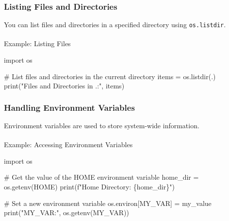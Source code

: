 \documentclass[
  letterpaper,
  DIV=11,
  numbers=noendperiod]{scrreprt}
\makeatletter
\let\oldparagraph\paragraph
\renewcommand{\paragraph}{
    \@ifstar
      \xxxParagraphStar
      \xxxParagraphNoStar
  }
\newcommand{\xxxParagraphStar}[1]{\oldparagraph*{#1}\mbox{}}
\newcommand{\xxxParagraphNoStar}[1]{\oldparagraph{#1}\mbox{}}
\newenvironment{Shaded}{\begin{snugshade}}{\end{snugshade}}
\newcommand{\BuiltInTok}[1]{\textcolor[rgb]{0.00,0.23,0.31}{#1}}
\newcommand{\CommentTok}[1]{\textcolor[rgb]{0.37,0.37,0.37}{#1}}
\newcommand{\ImportTok}[1]{\textcolor[rgb]{0.00,0.46,0.62}{#1}}
\newcommand{\NormalTok}[1]{\textcolor[rgb]{0.00,0.23,0.31}{#1}}
\newcommand{\OperatorTok}[1]{\textcolor[rgb]{0.37,0.37,0.37}{#1}}
\newcommand{\SpecialCharTok}[1]{\textcolor[rgb]{0.37,0.37,0.37}{#1}}
\newcommand{\SpecialStringTok}[1]{\textcolor[rgb]{0.13,0.47,0.30}{#1}}
\newcommand{\StringTok}[1]{\textcolor[rgb]{0.13,0.47,0.30}{#1}}
\makeatother
\begin{document}
\subsubsection{Listing Files and
Directories}\label{listing-files-and-directories}

You can list files and directories in a specified directory using
\texttt{os.listdir}.

\paragraph{Example: Listing Files}\label{example-listing-files}

\begin{Shaded}
\begin{Highlighting}[]
\ImportTok{import}\NormalTok{ os}

\CommentTok{\# List files and directories in the current directory}
\NormalTok{items }\OperatorTok{=}\NormalTok{ os.listdir(}\StringTok{\textquotesingle{}.\textquotesingle{}}\NormalTok{)}
\BuiltInTok{print}\NormalTok{(}\StringTok{"Files and Directories in \textquotesingle{}.\textquotesingle{}:"}\NormalTok{, items)}
\end{Highlighting}
\end{Shaded}

\subsubsection{Handling Environment
Variables}\label{handling-environment-variables}

Environment variables are used to store system-wide information.

\paragraph{Example: Accessing Environment
Variables}\label{example-accessing-environment-variables}

\begin{Shaded}
\begin{Highlighting}[]
\ImportTok{import}\NormalTok{ os}

\CommentTok{\# Get the value of the \textquotesingle{}HOME\textquotesingle{} environment variable}
\NormalTok{home\_dir }\OperatorTok{=}\NormalTok{ os.getenv(}\StringTok{\textquotesingle{}HOME\textquotesingle{}}\NormalTok{)}
\BuiltInTok{print}\NormalTok{(}\SpecialStringTok{f"Home Directory: }\SpecialCharTok{\{}\NormalTok{home\_dir}\SpecialCharTok{\}}\SpecialStringTok{"}\NormalTok{)}

\CommentTok{\# Set a new environment variable}
\NormalTok{os.environ[}\StringTok{\textquotesingle{}MY\_VAR\textquotesingle{}}\NormalTok{] }\OperatorTok{=} \StringTok{\textquotesingle{}my\_value\textquotesingle{}}
\BuiltInTok{print}\NormalTok{(}\StringTok{"MY\_VAR:"}\NormalTok{, os.getenv(}\StringTok{\textquotesingle{}MY\_VAR\textquotesingle{}}\NormalTok{))}
\end{Highlighting}
\end{Shaded}
\end{document}
